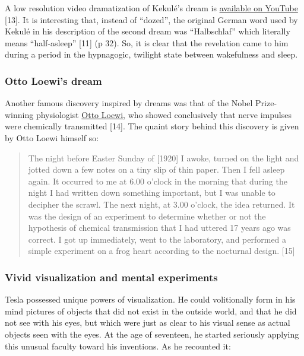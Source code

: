 \documentclass[
  12pt,
  british,
  a4paper,
]{article}
\begin{document}
A low resolution video dramatization of Kekulé's dream is
\href{https://www.youtube.com/watch?v=2NRwd-JJFm4}{available on YouTube}
{[}13{]}. It is interesting that, instead of ``dozed'', the original
German word used by Kekulé in his description of the second dream was
``Halbschlaf'' which literally means ``half-asleep'' {[}11{]} (p 32).
So, it is clear that the revelation came to him during a period in the
hypnagogic, twilight state between wakefulness and sleep.

\hypertarget{otto-loewis-dream}{%
\subsubsection{Otto Loewi's dream}\label{otto-loewis-dream}}

Another famous discovery inspired by dreams was that of the Nobel
Prize-winning physiologist
\href{https://en.wikipedia.org/wiki/Otto_Loewi}{Otto Loewi}, who showed
conclusively that nerve impulses were chemically transmitted {[}14{]}.
The quaint story behind this discovery is given by Otto Loewi himself
so:

\begin{quote}
The night before Easter Sunday of {[}1920{]} I awoke, turned on the
light and jotted down a few notes on a tiny slip of thin paper. Then I
fell asleep again. It occurred to me at 6.00 o'clock in the morning that
during the night I had written down something important, but I was
unable to decipher the scrawl. The next night, at 3.00 o'clock, the idea
returned. It was the design of an experiment to determine whether or not
the hypothesis of chemical transmission that I had uttered 17 years ago
was correct. I got up immediately, went to the laboratory, and performed
a simple experiment on a frog heart according to the nocturnal design.
{[}15{]}
\end{quote}

\hypertarget{vivid-visualization-and-mental-experiments}{%
\subsubsection{Vivid visualization and mental
experiments}\label{vivid-visualization-and-mental-experiments}}

Tesla possessed unique powers of visualization. He could volitionally
form in his mind pictures of objects that did not exist in the outside
world, and that he did not see with his eyes, but which were just as
clear to his visual sense as actual objects seen with the eyes. At the
age of seventeen, he started seriously applying this unusual faculty
toward his inventions. As he recounted it:
\end{document}

